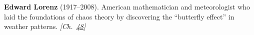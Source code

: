 \textbf{Edward Lorenz} (1917–2008). American mathematician and meteorologist who laid the foundations of chaos theory by discovering the ``butterfly effect'' in weather patterns. \emph{[Ch.~\hyperref[ch:threebody]{48}]}

